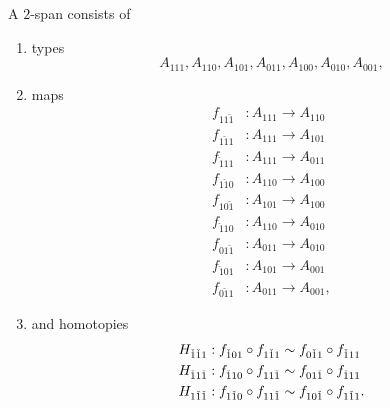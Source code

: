 \begin{defn}
A $2$-span consists of 
\begin{enumerate}
\item types
\begin{equation*}
A_{111},A_{110},A_{101},A_{011},A_{100},A_{010},A_{001},
\end{equation*}
\item maps
\begin{align*}
f_{11\check{1}} & : A_{111} \to A_{110}\\
f_{1\check{1}1} & : A_{111} \to A_{101}\\
f_{\check{1}11} & : A_{111} \to A_{011}\\
f_{1\check{1}0} & : A_{110} \to A_{100}\\
f_{10\check{1}} & : A_{101} \to A_{100}\\
f_{\check{1}10} & : A_{110} \to A_{010}\\
f_{01\check{1}} & : A_{011} \to A_{010}\\
f_{\check{1}01} & : A_{101} \to A_{001}\\
f_{0\check{1}1} & : A_{011} \to A_{001},
\end{align*}
\item and homotopies
\begin{align*}
H_{\check{1}\check{1}1} & : f_{\check{1}01}\circ f_{1\check{1}1} \sim f_{0\check{1}1}\circ f_{\check{1}11} \\
H_{\check{1}1\check{1}} & : f_{\check{1}10}\circ f_{11\check{1}} \sim f_{01\check{1}}\circ f_{\check{1}11} \\
H_{1\check{1}\check{1}} & : f_{1\check{1}0}\circ f_{11\check{1}} \sim f_{10\check{1}}\circ f_{1\check{1}1}.
\end{align*}
\end{enumerate}
\end{defn}

